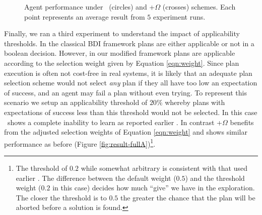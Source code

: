 \begin{figure*}[t]
\begin{center}
\qquad
{}
\caption{Agent performance under \CL\ (circles) and \CL+$\Omega$ (crosses) schemes. Each point represents an average result from $5$ experiment runs.}
\label{fig:result-full}
\end{center}
\end{figure*}

Finally, we ran a third experiment to understand the impact of applicability thresholds. In the classical BDI framework plans are either applicable or not in a boolean decision. However, in our modified framework plans are applicable according to the selection weight given by Equation \ref{eqn:weight}. Since plan execution is often not cost-free in real systems, it is likely that an adequate plan selection scheme would not select \textit{any} plan if they all have too low an expectation of success, and an agent may fail a plan without even trying. To represent this scenario we setup an applicability threshold of $20\%$ whereby plans with expectations of success less than this threshold would not be selected. In this case \CL\ shows a complete inability to learn as reported earlier \cite{Singh:AAMAS10}. In contrast \CL+$\Omega$ benefits from the adjusted selection weights of Equation \ref{eqn:weight} and shows similar performance as before (Figure \ref{fig:result-fullA})\footnote{The threshold of $0.2$ while somewhat arbitrary is consistent with that used earlier \cite{Singh:AAMAS10}. The difference between the default weight ($0.5$) and the threshold weight ($0.2$ in this case) decides how much ``give'' we have in the exploration. The closer the threshold is to $0.5$ the greater the chance that the plan will be aborted before a solution is found.}.


